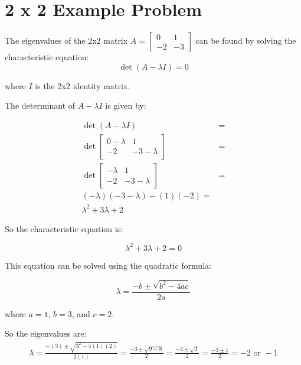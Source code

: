 \documentclass[a4paper]{article}
\begin{document}
\section{2 x 2 Example Problem}

The eigenvalues of the 2x2 matrix 
$A = \begin{bmatrix} 0 & 1 \\ -2 & -3 \end{bmatrix}$ can be found by solving the characteristic equation:
\begin{equation}
    \det(A - \lambda I) = 0
\end{equation}


where $I$ is the 2x2 identity matrix. 

The determinant of $A - \lambda I$ is given by:

\begin{align*}
    \det(A - \lambda I) &= \\
    \det\begin{bmatrix} 
        0 - \lambda & 1 \\ 
        -2 & -3 - \lambda 
    \end{bmatrix} 
                        &=  \\
    \det\begin{bmatrix} 
    -\lambda & 1 \\ 
    -2 & -3 - \lambda 
\end{bmatrix} &= \\
    (-\lambda)(-3 - \lambda) - (1)(-2) = \\
    \lambda^2 + 3\lambda + 2 
\end{align*}

So the characteristic equation is:

\begin{equation}
    \lambda^2 + 3\lambda + 2 = 0
\end{equation}

This equation can be solved using the quadratic formula:

\begin{equation}
    \lambda = \frac{-b \pm \sqrt{b^2 - 4ac}}{2a}
\end{equation}

where $a = 1$, $b = 3$, and $c = 2$.

So the eigenvalues are:
\begin{align*}
    \lambda = \frac{-(3) \pm \sqrt{3^2 - 4(1)(2)}}{2(1)} = \frac{-3 \pm \sqrt{9 - 8}}{2} = \frac{-3 \pm \sqrt{1}}{2} = \frac{-3 \pm 1}{2} = -2 \text{ or } -1 
\end{align*}
\end{document}
